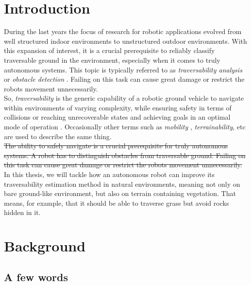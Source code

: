\documentclass[12pt,a4paper]{report}
\newcommand{\term}{\textit}
\begin{document}
	{
		\hypersetup{linkcolor=black}
		\tableofcontents
	}
	
	\chapter{Introduction}
	\label{sec:intro}
	
	During the last years the focus of research for robotic applications evolved 
	from well structured indoor environments to unstructured outdoor environments. 
	With this expansion of interest, it is a crucial prerequisite to reliably 
	classify traversable ground in the environment, especially when it comes to 
	truly autonomous systems. This topic is typically referred to as 
	\term{traversability analysis} or \term{obstacle detection} \cite{Suger}. 
	Failing on this	task can cause great damage or restrict the robots movement 
	unnecessarily.
	\\
	
	So, \term{traversability} is the generic capability of a robotic ground 
	vehicle to navigate within environments of varying complexity, while ensuring 
	safety in terms of collisions or reaching unrecoverable states and achieving 
	goals in an optimal mode of operation \cite{Papadakis}. Occasionally other 
	terms such as \term{mobility} \cite{Lalonde}, \term{terrainability}, etc are 
	used to describe the same thing.
	\\
	
	\sout{The ability to safely navigate is a crucial prerequisite for truly 
	autonomous systems. A robot has to distinguish obstacles from traversable 
	ground. Failing on this	task can cause great damage or restrict the robots 
	movement unnecessarily.}
	\\
	
	In this thesis, we will tackle how an autonomous robot can improve its 
	traversability estimation method in natural environments, meaning not only 
	on bare ground-like environment, but also on terrain containing vegetation. 
	That means, for example, that it should be able to traverse grass but avoid 
	rocks hidden in it.
	
	\chapter{Background}
	\label{sec:bg}
	
	\section{A few words}
	\label{sec:bg:intro}
	
\end{document}
